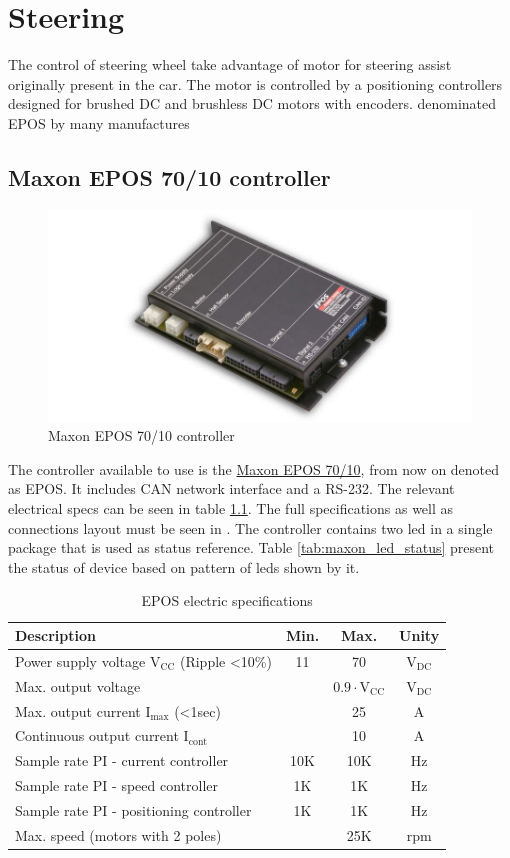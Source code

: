 \chapter{Steering}
The control of steering wheel take advantage of motor for steering assist originally present in the car. The motor is controlled by a positioning controllers designed for brushed DC and brushless DC motors with encoders. denominated \gls{EPOS} by many manufactures

\section{Maxon EPOS 70/10 controller}
\begin{figure}[h]
	\centering
	\includegraphics[width=0.5\linewidth]{figures/EPOS-70-10-10-A-11-70VDC-Detail.jpg}
	\caption{Maxon EPOS 70/10 controller}
	\label{fig:maxon_epos}
\end{figure}
The controller available to use is the \href{https://www.maxonmotor.com/maxon/view/product/control/Positionierung/300583}{Maxon EPOS 70/10}, from now on denoted as EPOS. It includes CAN network interface and a RS-232. The relevant electrical specs can be seen in table \ref{tab:epos_specs}. The full specifications as well as connections layout must be seen in \cite{epos_hardware}. The controller contains two led in a single package that is used as status reference. Table \ref{tab:maxon_led_status} present the status of device based on pattern of leds shown by it.

\begin{table}[hb]
	\centering
	\begin{tabular}{lccc}
		\toprule
		\textbf{Description} & \textbf{Min.} & \textbf{Max.} & \textbf{Unity}\\
		\midrule
		Power supply voltage $\text{V}_\text{CC}$ (Ripple \textless 10\%) & 11 & 70 & $\text{V}_\text{DC}$\\
		Max. output voltage & & $0.9\cdot\text{V}_\text{CC}$ & $\text{V}_\text{DC}$\\
		Max. output current $\text{I}_\text{max}$ (\textless 1sec) &  & 25 & A\\
		Continuous output current $\text{I}_\text{cont}$ & & 10 & A\\
		Sample rate PI - current controller &10K & 10K & Hz\\ 
		Sample rate PI - speed controller  &1K & 1K & Hz\\ 
		Sample rate PI - positioning controller &1K & 1K & Hz\\
		Max. speed (motors with 2 poles) & & 25K & rpm\\
		\bottomrule
	\end{tabular}
    \caption{EPOS electric specifications}
    \label{tab:epos_specs}
\end{table}

